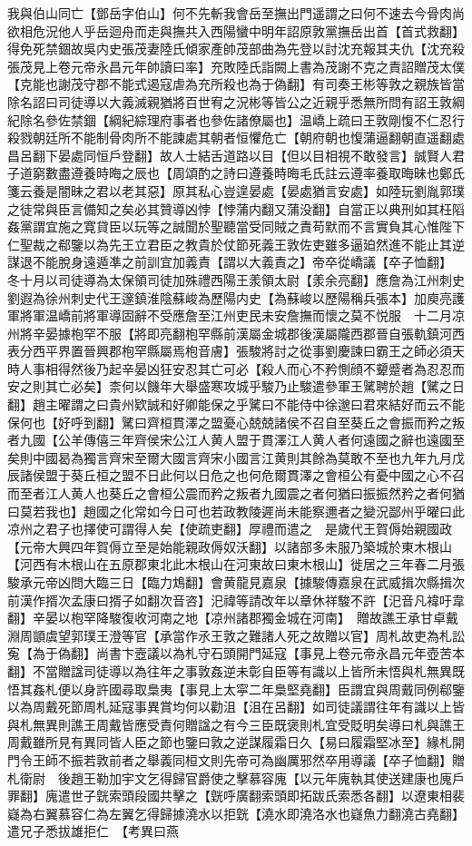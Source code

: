 我與伯山同亡【鄧岳字伯山】何不先斬我會岳至撫出門遥謂之曰何不速去今骨肉尚欲相危況他人乎岳迴舟而走與撫共入西陽蠻中明年詔原敦黨撫岳出首【首式救翻】得免死禁錮故吳内史張茂妻陸氏傾家產帥茂部曲為先登以討沈充報其夫仇【沈充殺張茂見上卷元帝永昌元年帥讀曰率】充敗陸氏詣闕上書為茂謝不克之責詔贈茂太僕【克能也謝茂守郡不能式遏寇虐為充所殺也為于偽翻】有司奏王彬等敦之親族皆當除名詔曰司徒導以大義滅親猶將百世宥之況彬等皆公之近親乎悉無所問有詔王敦綱紀除名參佐禁錮【綱紀綜理府事者也參佐諸僚屬也】温嶠上疏曰王敦剛愎不仁忍行殺戮朝廷所不能制骨肉所不能諫處其朝者恒懼危亡【朝府朝也愎蒲逼翻朝直遥翻處昌呂翻下晏處同恒戶登翻】故人士結舌道路以目【但以目相視不敢發言】誠賢人君子道窮數盡遵養時晦之辰也【周頌酌之詩曰遵養時晦毛氏註云遵率養取晦昧也鄭氏箋云養是闇昧之君以老其惡】原其私心豈遑晏處【晏處猶言安處】如陸玩劉胤郭璞之徒常與臣言備知之矣必其贊導凶悖【悖蒲内翻又蒲没翻】自當正以典刑如其枉䧟姦黨謂宜施之寛貸臣以玩等之誠聞於聖聽當受同賊之責苟默而不言實負其心惟陛下仁聖裁之郗鑒以為先王立君臣之教貴於仗節死義王敦佐吏雖多逼廹然進不能止其逆謀退不能脫身遠遁凖之前訓宜加義責【謂以大義責之】帝卒從嶠議【卒子恤翻】　冬十月以司徒導為太保領司徒加殊禮西陽王羕領太尉【羕余亮翻】應詹為江州刺史劉遐為徐州刺史代王邃鎮淮陰蘇峻為歷陽内史【為蘇峻以歷陽稱兵張本】加庾亮護軍將軍温嶠前將軍導固辭不受應詹至江州吏民未安詹撫而懷之莫不悦服　十二月凉州將辛晏據枹罕不服【將即亮翻枹罕縣前漢屬金城郡後漢屬隴西郡晉自張軌鎮河西表分西平界置晉興郡枹罕縣屬焉枹音膚】張駿將討之從事劉慶諫曰霸王之師必須天時人事相得然後乃起辛晏凶狂安忍其亡可必【殺人而心不矜惻顔不顰蹙者為忍忍而安之則其亡必矣】柰何以饑年大舉盛寒攻城乎駿乃止駿遣參軍王騭聘於趙【騭之日翻】趙主曜謂之曰貴州欵誠和好卿能保之乎騭曰不能侍中徐邈曰君來結好而云不能保何也【好呼到翻】騭曰齊桓貫澤之盟憂心兢兢諸侯不召自至葵丘之會振而矜之叛者九國【公羊傳僖三年齊侯宋公江人黄人盟于貫澤江人黄人者何遠國之辭也遠國至矣則中國曷為獨言齊宋至爾大國言齊宋小國言江黄則其餘為莫敢不至也九年九月戊辰諸侯盟于葵丘桓之盟不日此何以日危之也何危爾貫澤之會桓公有憂中國之心不召而至者江人黄人也葵丘之會桓公震而矜之叛者九國震之者何猶曰振振然矜之者何猶曰莫若我也】趙國之化常如今日可也若政教陵遲尚未能察邇者之變況鄙州乎曜曰此凉州之君子也擇使可謂得人矣【使疏吏翻】厚禮而遣之　是歲代王賀傉始親國政【元帝大興四年賀傉立至是始能親政傉奴沃翻】以諸部多未服乃築城於東木根山【河西有木根山在五原郡東北此木根山在河東故曰東木根山】徙居之三年春二月張駿承元帝凶問大臨三日【臨力鴆翻】會黄龍見嘉泉【據駿傳嘉泉在武威揖次縣揖次前漢作揟次孟康曰揟子如翻次音咨】汜禕等請改年以章休祥駿不許【汜音凡褘吁韋翻】辛晏以枹罕降駿復收河南之地【凉州諸郡獨金城在河南】　贈故譙王承甘卓戴淵周顗虞望郭璞王澄等官【承當作氶王敦之難諸人死之故贈以官】周札故吏為札訟寃【為于偽翻】尚書卞壼議以為札守石頭開門延寇【事見上卷元帝永昌元年壺苦本翻】不當贈諡司徒導以為往年之事敦姦逆未彰自臣等有識以上皆所未悟與札無異既悟其姦札便以身許國尋取梟夷【事見上太寜二年梟堅堯翻】臣謂宜與周戴同例郗鑒以為周戴死節周札延寇事異賞均何以勸沮【沮在呂翻】如司徒議謂往年有識以上皆與札無異則譙王周戴皆應受責何贈諡之有今三臣既褒則札宜受貶明矣導曰札與譙王周戴雖所見有異同皆人臣之節也鑒曰敦之逆謀履霜日久【易曰履霜堅冰至】緣札開門令王師不振若敦前者之舉義同桓文則先帝可為幽厲邪然卒用導議【卒子恤翻】贈札衛尉　後趙王勒加宇文乞得歸官爵使之擊慕容廆【以元年廆執其使送建康也廆戶罪翻】廆遣世子皝索頭段國共擊之【皝呼廣翻索頭即拓跋氏索悉各翻】以遼東相裴嶷為右翼慕容仁為左翼乞得歸據澆水以拒皝【澆水即澆洛水也嶷魚力翻澆古堯翻】遣兄子悉拔雄拒仁　【考異曰燕